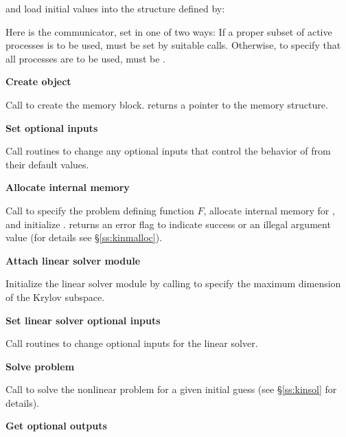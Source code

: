 \begin{Steps}
  and load initial values into the structure defined by:

  {\s} 

  {\p} 

  Here  is the {\mpi} communicator, set in one of two ways: 
  If a proper subset of active processes is to be used,  
  must be set by suitable {\mpi} calls. Otherwise, to specify that all 
  processes are to be used,  must be .
  
\item\label{i:kinsol_create} 
  {\bf Create {\kinsol} object}

  Call  
  to create the {\kinsol} memory block.
   returns a pointer to the {\kinsol} memory structure.

\item
  {\bf Set optional inputs}

  Call  routines to change any
  optional inputs that control the behavior of {\kinsol} from their default 
  values.

\item\label{i:kinsol_malloc} 
  {\bf Allocate internal memory}

  Call  
  to specify the problem defining function $F$,
  allocate internal memory for {\kinsol}, 
  and initialize {\kinsol}.
   returns an error flag to indicate success or an illegal argument value
  (for details see \S\ref{ss:kinmalloc}).

\item\label{i:lin_solver} 
  {\bf Attach linear solver module}

  Initialize the linear solver module by calling 
  to specify the maximum dimension of the Krylov subspace.

\item
  {\bf Set linear solver optional inputs}

  Call  routines to change optional inputs  
  for the {\kinspgmr} linear solver.

\item
  {\bf Solve problem}

  Call  to solve the nonlinear problem for a given
  initial guess (see \S\ref{ss:kinsol} for details).

\item
  {\bf Get optional outputs}


\end{Steps}
